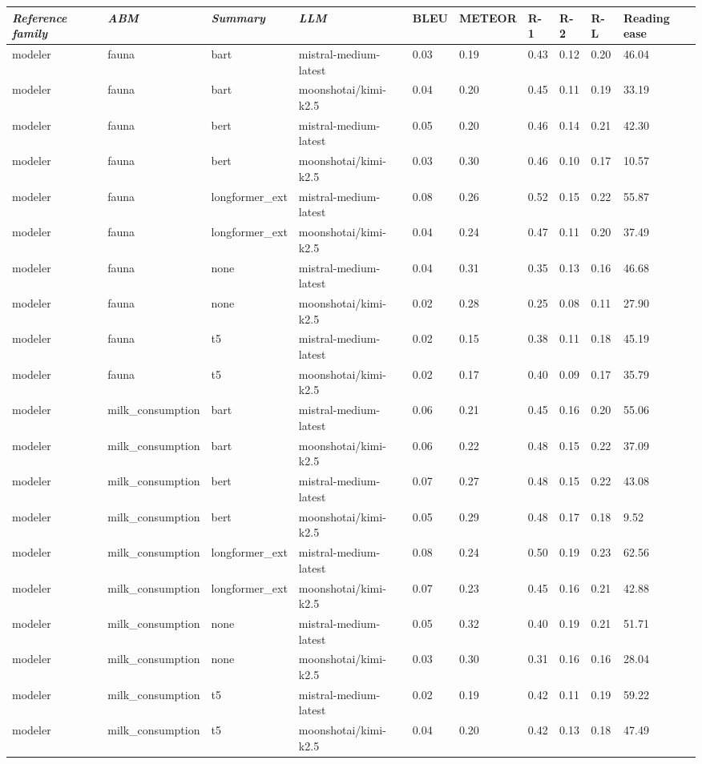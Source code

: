 \begin{tabular}{|l|l|l|l|l|l|l|l|l|l|}
\hline
\textit{\textbf{Reference family}} & \textit{\textbf{ABM}} & \textit{\textbf{Summary}} & \textit{\textbf{LLM}} & BLEU & METEOR & R-1 & R-2 & R-L & Reading ease \\
 \hline
 modeler & fauna & bart & mistral-medium-latest & 0.03 & 0.19 & 0.43 & 0.12 & 0.20 & 46.04 \\
 \hline
 modeler & fauna & bart & moonshotai/kimi-k2.5 & 0.04 & 0.20 & 0.45 & 0.11 & 0.19 & 33.19 \\
 \hline
 modeler & fauna & bert & mistral-medium-latest & 0.05 & 0.20 & 0.46 & 0.14 & 0.21 & 42.30 \\
 \hline
 modeler & fauna & bert & moonshotai/kimi-k2.5 & 0.03 & 0.30 & 0.46 & 0.10 & 0.17 & 10.57 \\
 \hline
 modeler & fauna & longformer\_ext & mistral-medium-latest & 0.08 & 0.26 & 0.52 & 0.15 & 0.22 & 55.87 \\
 \hline
 modeler & fauna & longformer\_ext & moonshotai/kimi-k2.5 & 0.04 & 0.24 & 0.47 & 0.11 & 0.20 & 37.49 \\
 \hline
 modeler & fauna & none & mistral-medium-latest & 0.04 & 0.31 & 0.35 & 0.13 & 0.16 & 46.68 \\
 \hline
 modeler & fauna & none & moonshotai/kimi-k2.5 & 0.02 & 0.28 & 0.25 & 0.08 & 0.11 & 27.90 \\
 \hline
 modeler & fauna & t5 & mistral-medium-latest & 0.02 & 0.15 & 0.38 & 0.11 & 0.18 & 45.19 \\
 \hline
 modeler & fauna & t5 & moonshotai/kimi-k2.5 & 0.02 & 0.17 & 0.40 & 0.09 & 0.17 & 35.79 \\
 \hline
 modeler & milk\_consumption & bart & mistral-medium-latest & 0.06 & 0.21 & 0.45 & 0.16 & 0.20 & 55.06 \\
 \hline
 modeler & milk\_consumption & bart & moonshotai/kimi-k2.5 & 0.06 & 0.22 & 0.48 & 0.15 & 0.22 & 37.09 \\
 \hline
 modeler & milk\_consumption & bert & mistral-medium-latest & 0.07 & 0.27 & 0.48 & 0.15 & 0.22 & 43.08 \\
 \hline
 modeler & milk\_consumption & bert & moonshotai/kimi-k2.5 & 0.05 & 0.29 & 0.48 & 0.17 & 0.18 & 9.52 \\
 \hline
 modeler & milk\_consumption & longformer\_ext & mistral-medium-latest & 0.08 & 0.24 & 0.50 & 0.19 & 0.23 & 62.56 \\
 \hline
 modeler & milk\_consumption & longformer\_ext & moonshotai/kimi-k2.5 & 0.07 & 0.23 & 0.45 & 0.16 & 0.21 & 42.88 \\
 \hline
 modeler & milk\_consumption & none & mistral-medium-latest & 0.05 & 0.32 & 0.40 & 0.19 & 0.21 & 51.71 \\
 \hline
 modeler & milk\_consumption & none & moonshotai/kimi-k2.5 & 0.03 & 0.30 & 0.31 & 0.16 & 0.16 & 28.04 \\
 \hline
 modeler & milk\_consumption & t5 & mistral-medium-latest & 0.02 & 0.19 & 0.42 & 0.11 & 0.19 & 59.22 \\
 \hline
 modeler & milk\_consumption & t5 & moonshotai/kimi-k2.5 & 0.04 & 0.20 & 0.42 & 0.13 & 0.18 & 47.49 \\
\hline
\end{tabular}
